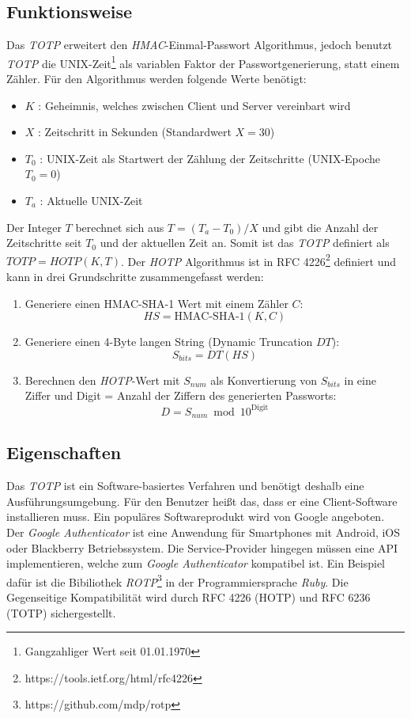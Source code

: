 \documentclass[11pt,a4paper,ngerman]{scrreprt}
\begin{document}
\subsection{Funktionsweise}
Das \textit{TOTP} erweitert den \textit{HMAC}-Einmal-Passwort Algorithmus, jedoch benutzt \textit{TOTP} die UNIX-Zeit\footnote{Gangzahliger Wert seit 01.01.1970} als variablen Faktor der Passwortgenerierung, statt einem Zähler. Für den Algorithmus werden folgende Werte benötigt:
\begin{itemize}
    \item $K$ : Geheimnis, welches zwischen Client und Server vereinbart wird
    \item $X$ : Zeitschritt in Sekunden (Standardwert $X = 30$)
    \item $T_0$ : UNIX-Zeit als Startwert der Zählung der Zeitschritte (UNIX-Epoche $T_0 = 0$)
    \item $T_a$ : Aktuelle UNIX-Zeit
\end{itemize}
Der Integer $T$ berechnet sich aus $T = (T_a - T_0) / X$ und gibt die Anzahl der Zeitschritte seit $T_0$ und der aktuellen Zeit an. Somit ist das \textit{TOTP} definiert als $TOTP = HOTP(K, T)$. Der \textit{HOTP} Algorithmus ist in RFC 4226\footnote{https://tools.ietf.org/html/rfc4226} definiert und kann in drei Grundschritte zusammengefasst werden:
\begin{enumerate}
    \item Generiere einen HMAC-SHA-1 Wert mit einem Zähler $C$: 
    \[
        HS = \textrm{HMAC-SHA-1}(K, C)
    \]
    \item Generiere einen 4-Byte langen String (Dynamic Truncation $DT$): 
    \[
        S_{bits} = DT(HS)
    \]
    \item Berechnen den \textit{HOTP}-Wert mit $S_{num}$ als Konvertierung von $S_{bits}$ in eine Ziffer und Digit = Anzahl der Ziffern des generierten Passworts:
    \[
        D = S_{num} \bmod 10^{\textrm{Digit}}
    \]
\end{enumerate}
\subsection{Eigenschaften}
Das \textit{TOTP} ist ein Software-basiertes Verfahren und benötigt deshalb eine Ausführungsumgebung. Für den Benutzer heißt das, dass er eine Client-Software installieren muss. Ein populäres Softwareprodukt wird von Google angeboten. Der \textit{Google Authenticator} ist eine Anwendung für Smartphones mit Android, iOS oder Blackberry Betriebssystem. Die Service-Provider hingegen müssen eine API implementieren, welche zum \textit{Google Authenticator} kompatibel ist. Ein Beispiel dafür ist die Bibiliothek \textit{ROTP}\footnote{https://github.com/mdp/rotp} in der Programmiersprache \textit{Ruby}. Die Gegenseitige Kompatibilität wird durch RFC 4226 (HOTP) und RFC 6236 (TOTP) sichergestellt.
\end{document}
